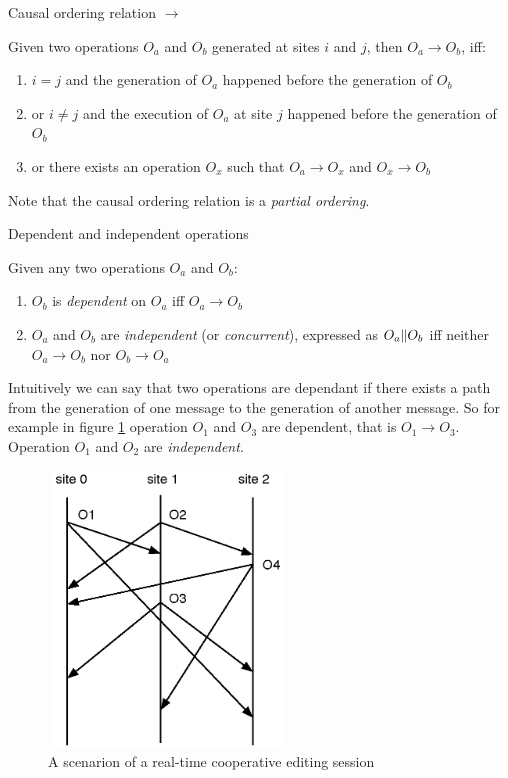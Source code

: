 \begin{defn}
Causal ordering relation $\rightarrow$
\end{defn}

Given two operations $O_{a}$ and $O_{b}$ generated at sites $i$ and $j$, then $O_{a}\rightarrow O_{b}$, iff:
\begin{enumerate}
 \item $i=j$ and the generation of $O_{a}$ happened before the generation of 
       $O_{b}$
 \item or $i \neq j$ and the execution of $O_{a}$ at site $j$ happened before 
       the generation of $O_{b}$
 \item or there exists an operation $O_{x}$ such that $O_{a}\rightarrow O_{x}$
       and $O_{x}\rightarrow O_{b}$
\end{enumerate}

Note that the causal ordering relation is a \emph{partial ordering}.

\begin{defn}
Dependent and independent operations
\end{defn}

Given any two operations $O_{a}$ and $O_{b}$:
\begin{enumerate}
 \item $O_{b}$ is \emph{dependent} on $O_{a}$ iff $O_{a} \rightarrow O_{b}$
 \item $O_{a}$ and $O_{b}$ are \emph{independent} (or \emph{concurrent}), 
       expressed as $O_{a} \Arrowvert O_{b}$ iff neither 
       $O_{a}\rightarrow O_{b}$ nor $O_{b}\rightarrow O_{a}$
\end{enumerate}

Intuitively we can say that two operations are dependant if there exists a path from the generation of one message to the generation of another message. So for example in figure \ref{fig:example1} operation $O_{1}$ and $O_{3}$ are dependent, that is $O_{1}\rightarrow O_{3}$. Operation $O_{1}$ and $O_{2}$ are \emph{independent}. 

\begin{figure}
 \centering
 \includegraphics[width=2.5in,height=2.88in]{../images/finalreport/example1.eps}
 \caption{A scenarion of a real-time cooperative editing session}
 \label{fig:example1}
\end{figure}

